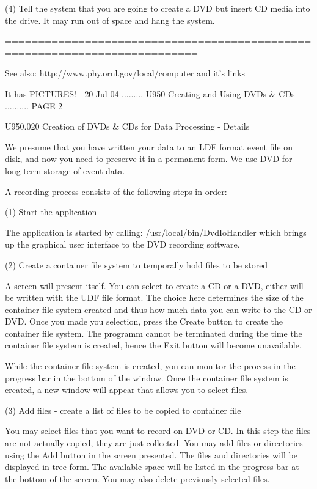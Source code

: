    (4)  Tell the system that you are going to create a DVD but insert CD media
   into the drive. It may run out of space and hang the system.
 
   ===========================================================================
 
       See also:   http://www.phy.ornl.gov/local/computer   and it's links
 
                                It has PICTURES!
    
   20-Jul-04 ......... U950  Creating and Using DVDs & CDs .......... PAGE   2
 
 
   U950.020  Creation of DVDs & CDs for Data Processing - Details
 
   We presume that you have written your data to an LDF format event  file  on
   disk,  and  now you need to preserve it in a permanent form. We use DVD for
   long-term storage of event data.
 
   A recording process consists of the following steps in order:
 
   (1) Start the application
 
   The application is started by  calling:  /usr/local/bin/DvdIoHandler  which
   brings up the graphical user interface to the DVD recording software.
 
   (2) Create a container file system to temporally hold files to be stored
 
   A  screen  will  present  itself.   You can select to create a CD or a DVD,
   either  will  be  written  with  the  UDF  file  format.  The  choice  here
   determines  the size of the container file system created and thus how much
   data you can write to the CD or DVD. Once you  made  you  selection,  press
   the  Create button to create the container file system. The programm cannot
   be terminated during the time the container file system is  created,  hence
   the Exit button will become unavailable.
 
   While  the container file system is created, you can monitor the process in
   the progress bar in the bottom of  the  window.  Once  the  container  file
   system  is  created,  a  new  window  will appear that allows you to select
   files.
 
   (3) Add files - create a list of files to be copied to container file
 
   You may select files that you want to record on DVD or  CD.  In  this  step
   the  files  are  not  actually copied, they are just collected. You may add
   files or directories using the Add button in  the  screen  presented.   The
   files  and directories will be displayed in tree form.  The available space
   will be listed in the progress bar at the bottom of  the  screen.  You  may
   also delete previously selected files.
 
